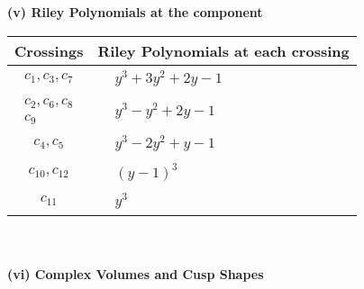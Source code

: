 \documentclass[1p]{elsarticle_modified}
\theoremstyle{definition}
\begin{document}
\newpage\renewcommand{\arraystretch}{1}
\flushleft \textbf{(v) Riley Polynomials at the component}\newline \\
\begin{tabular}{m{50pt}|m{274pt}}
Crossings & \hspace{64pt}Riley Polynomials at each crossing \\
\hline $$\begin{aligned}c_{1},c_{3},c_{7}\end{aligned}$$&$\begin{aligned}
&y^3+3 y^2+2 y-1
\end{aligned}$\\
\hline $$\begin{aligned}c_{2},c_{6},c_{8}\\c_{9}\end{aligned}$$&$\begin{aligned}
&y^3- y^2+2 y-1
\end{aligned}$\\
\hline $$\begin{aligned}c_{4},c_{5}\end{aligned}$$&$\begin{aligned}
&y^3-2 y^2+y-1
\end{aligned}$\\
\hline $$\begin{aligned}c_{10},c_{12}\end{aligned}$$&$\begin{aligned}
&(y-1)^3
\end{aligned}$\\
\hline $$\begin{aligned}c_{11}\end{aligned}$$&$\begin{aligned}
&y^3
\end{aligned}$\\
\hline
\end{tabular}\\~\\
\newpage\flushleft \textbf{(vi) Complex Volumes and Cusp Shapes}
\end{document}
